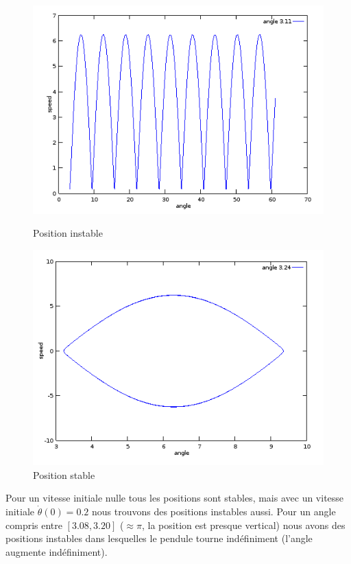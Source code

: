 \documentclass[a4paper,10pt]{article}
\begin{document}
\begin{enumerate}
\begin{figure}[ht]
    \begin{minipage}[b]{0.5\linewidth}
        \centering
        \includegraphics[scale=0.5]{./img/pendulum-unstable.png}
        \caption{Position instable}
    \end{minipage}
    \hspace{0.5cm}
    \begin{minipage}[b]{0.5\linewidth}
        \centering
        \includegraphics[scale=0.5]{./img/pendulum-stable.png}
        \caption{Position stable}
    \end{minipage}
\end{figure}

    Pour un vitesse initiale nulle tous les positions sont stables, mais avec un vitesse
    initiale $\dot{\theta}(0) = 0.2$ nous trouvons des positions instables aussi.
    Pour un angle compris entre $[3.08, 3.20]$ ($\approx \pi$, la position est presque
    vertical) nous avons des positions instables dans lesquelles le pendule tourne
    indéfiniment (l'angle augmente indéfiniment).


\end{enumerate}
\end{document}
